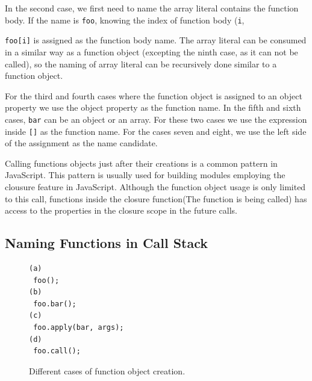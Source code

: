 \documentclass{acm_proc_article-sp}
\begin{document}
In the second case, we first need to name the array literal contains the function body. If the name is {\small\texttt{foo}}, knowing the index of function body ({\small\texttt{i}}, {{\small\texttt{foo[i]}} is assigned as the function body name. The array literal can be consumed in a similar way as a function object (excepting the ninth case, as it can not be called), so the naming of array literal can be recursively done similar to a function object.

For the third and fourth cases where the function object is assigned to an object property we use the object property as the function name. In the fifth and sixth cases, {\small\texttt{bar}} can be an object or an array. For these two cases we use the expression inside {\small\texttt{[]}} as the function name. For the cases seven and eight, we use the left side of the assignment as the name candidate.

Calling functions objects just after their creations is a common pattern in JavaScript. This pattern is usually used for building modules employing the clousure feature in JavaScript. Although the function object usage is only limited to this call, functions inside the closure function(The function is being called) has access to the properties in the closure scope in the future calls. 
 

\subsection{Naming Functions in Call Stack}








\begin{figure}[htp]
\begin{verbatim}
(a)
 foo();
(b)
 foo.bar();
(c)
 foo.apply(bar, args);
(d)
 foo.call();
\end{verbatim}
\caption{Different cases of function object creation.}
\label{fig:functionCall}
\end{figure}

}
\end{document}
